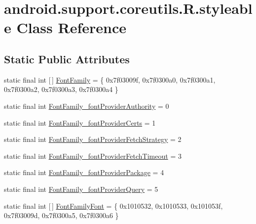 \hypertarget{classandroid_1_1support_1_1coreutils_1_1_r_1_1styleable}{}\section{android.\+support.\+coreutils.\+R.\+styleable Class Reference}
\label{classandroid_1_1support_1_1coreutils_1_1_r_1_1styleable}
\subsection*{Static Public Attributes}
\begin{DoxyCompactItemize}
\item 
static final int \mbox{[}$\,$\mbox{]} \mbox{\hyperlink{classandroid_1_1support_1_1coreutils_1_1_r_1_1styleable_a909802582dff4a121b96f894071a74d4}{Font\+Family}} = \{ 0x7f03009f, 0x7f0300a0, 0x7f0300a1, 0x7f0300a2, 0x7f0300a3, 0x7f0300a4 \}
\item 
static final int \mbox{\hyperlink{classandroid_1_1support_1_1coreutils_1_1_r_1_1styleable_a3dde202e500185c4dd9e5cb5d397ac1d}{Font\+Family\+\_\+font\+Provider\+Authority}} = 0
\item 
static final int \mbox{\hyperlink{classandroid_1_1support_1_1coreutils_1_1_r_1_1styleable_af3414a02529093edfb982aed33d06f8a}{Font\+Family\+\_\+font\+Provider\+Certs}} = 1
\item 
static final int \mbox{\hyperlink{classandroid_1_1support_1_1coreutils_1_1_r_1_1styleable_a90712a2006d458ca15f64ad68931cd5a}{Font\+Family\+\_\+font\+Provider\+Fetch\+Strategy}} = 2
\item 
static final int \mbox{\hyperlink{classandroid_1_1support_1_1coreutils_1_1_r_1_1styleable_ae910707deacdf54439bfd9e6e86e918e}{Font\+Family\+\_\+font\+Provider\+Fetch\+Timeout}} = 3
\item 
static final int \mbox{\hyperlink{classandroid_1_1support_1_1coreutils_1_1_r_1_1styleable_a25776ad0f93b1067fcc6adeed3629cbb}{Font\+Family\+\_\+font\+Provider\+Package}} = 4
\item 
static final int \mbox{\hyperlink{classandroid_1_1support_1_1coreutils_1_1_r_1_1styleable_a511cef8a2fc759485401243861232103}{Font\+Family\+\_\+font\+Provider\+Query}} = 5
\item 
static final int \mbox{[}$\,$\mbox{]} \mbox{\hyperlink{classandroid_1_1support_1_1coreutils_1_1_r_1_1styleable_a92afa7abc4eaed5ef5e8ba232700bcc8}{Font\+Family\+Font}} = \{ 0x1010532, 0x1010533, 0x101053f, 0x7f03009d, 0x7f0300a5, 0x7f0300a6 \}

\end{DoxyCompactItemize}
